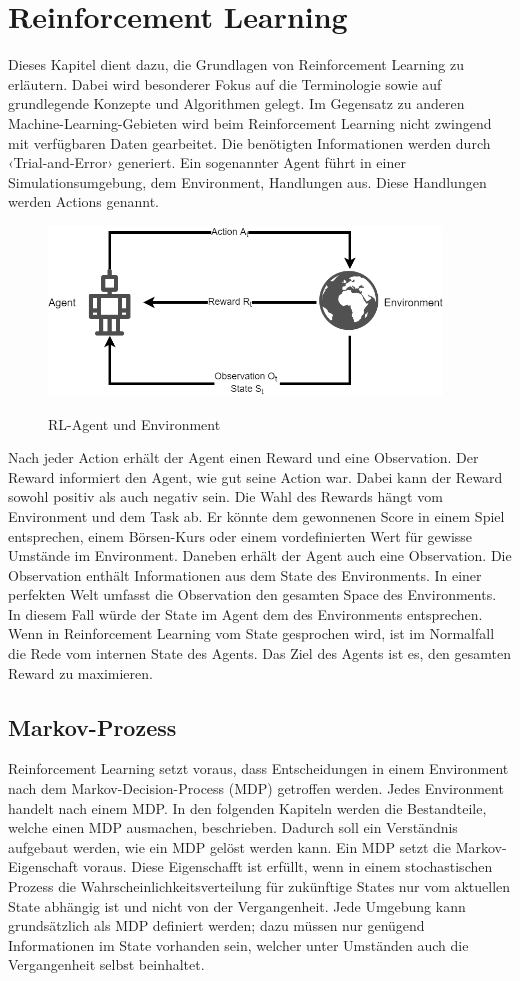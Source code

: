 \chapter{Reinforcement Learning} 
Dieses Kapitel dient dazu, die Grundlagen von Reinforcement Learning zu erläutern. Dabei wird besonderer Fokus auf die Terminologie sowie auf grundlegende Konzepte und Algorithmen gelegt. 
Im Gegensatz zu anderen Machine-Learning-Gebieten wird beim Reinforcement Learning nicht zwingend mit verfügbaren Daten gearbeitet. Die benötigten Informationen werden durch ‹Trial-and-Error› generiert. Ein sogenannter Agent führt in einer Simulationsumgebung, dem Environment, Handlungen aus. Diese Handlungen werden Actions genannt. 
 

 \begin{figure}[ht]
  \centering
  \includegraphics[height=4.5cm]{img/RL_Agent_Env.png}
  \label{rl_draw}
  \caption{RL-Agent und Environment}
\end{figure}

Nach jeder Action erhält der Agent einen Reward und eine Observation. Der Reward informiert den Agent, wie gut seine Action war. Dabei kann der Reward sowohl positiv als auch negativ sein. Die Wahl des Rewards hängt vom Environment und dem Task ab. Er könnte dem gewonnenen Score in einem Spiel entsprechen, einem Börsen-Kurs oder einem vordefinierten Wert für gewisse Umstände im Environment. Daneben erhält der Agent auch eine Observation. Die Observation enthält Informationen aus dem State des Environments. In einer perfekten Welt umfasst die Observation den gesamten Space des Environments. In diesem Fall würde der State im Agent dem des Environments entsprechen. Wenn in Reinforcement Learning vom State gesprochen wird, ist im Normalfall die Rede vom internen State des Agents. Das Ziel des Agents ist es, den gesamten Reward zu maximieren.

\section{Markov-Prozess}
Reinforcement Learning setzt voraus, dass Entscheidungen in einem Environment nach dem Markov-Decision-Process (MDP) getroffen werden. Jedes Environment handelt nach einem MDP. In den folgenden Kapiteln werden die Bestandteile, welche einen MDP ausmachen, beschrieben. Dadurch soll ein Verständnis aufgebaut werden, wie ein MDP gelöst werden kann. Ein MDP setzt die Markov-Eigenschaft voraus. Diese Eigenschafft ist erfüllt, wenn in einem stochastischen Prozess die Wahrscheinlichkeitsverteilung für zukünftige States nur vom aktuellen State abhängig ist und nicht von der Vergangenheit. Jede Umgebung kann grundsätzlich als MDP definiert werden; dazu müssen nur genügend Informationen im State vorhanden sein, welcher unter Umständen auch die Vergangenheit selbst beinhaltet.

